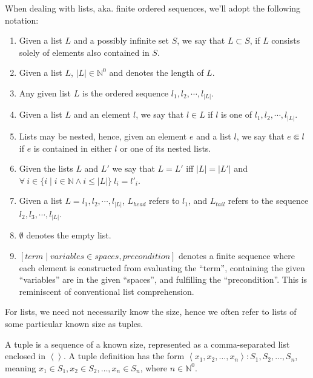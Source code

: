 \begin{definition} When dealing with lists, aka. finite ordered sequences,
we'll adopt the following notation:

\begin{enumerate}

\item Given a list $L$ and a possibly infinite set $S$, we say that $L\subset
S$, if $L$ consists solely of elements also contained in $S$.

\item Given a list $L$, $|L|\in\mathbb{N}^0$ and denotes the length of $L$.

\item Any given list $L$ is the ordered sequence $l_1,l_2,\cdots,l_{|L|}$.

\item Given a list $L$ and an element $l$, we say that $l\in L$ if $l$ is one
of $l_1,l_2,\cdots,l_{|L|}$.

\item Lists may be nested, hence, given an element $e$ and a list $l$, we say
that $e\Subset l$ if $e$ is contained in either $l$ or one of its nested lists.

\item Given the lists $L$ and $L'$ we say that $L=L'$ iff $|L|=|L'|$ and
$\forall\ i\in \{i\mid i\in\mathbb{N} \wedge i \leq |L|\}\ l_i=l'_i$.

\item Given a list $L=l_1,l_2,\cdots,l_{|L|}$, $L_{head}$ refers to $l_1$, and
$L_{tail}$ refers to the sequence $l_2,l_3,\cdots,l_{|L|}$.

\item $\emptyset$ denotes the empty list.

\item $\left[ term \mid variables \in spaces, precondition \right]$ denotes a
finite sequence where each element is constructed from evaluating the ``term'',
containing the given ``variables'' are in the given ``spaces'', and fulfilling
the ``precondition''. This is reminiscent of conventional list comprehension.

\end{enumerate}

\end{definition}

For lists, we need not necessarily know the size, hence we often refer to lists
of some particular known size as tuples.

\begin{definition} A tuple is a sequence of a known size, represented as a
comma-separated list enclosed in $\left\langle \right\rangle$. A tuple
definition has the form $\left\langle x_1,x_2,\ldots,x_n \right\rangle : S_1,
S_2, \ldots, S_n$, meaning $x_1\in S_1, x_2\in S_2, \ldots, x_n\in S_n$, where
$n\in\mathbb{N}^0$.\end{definition}

